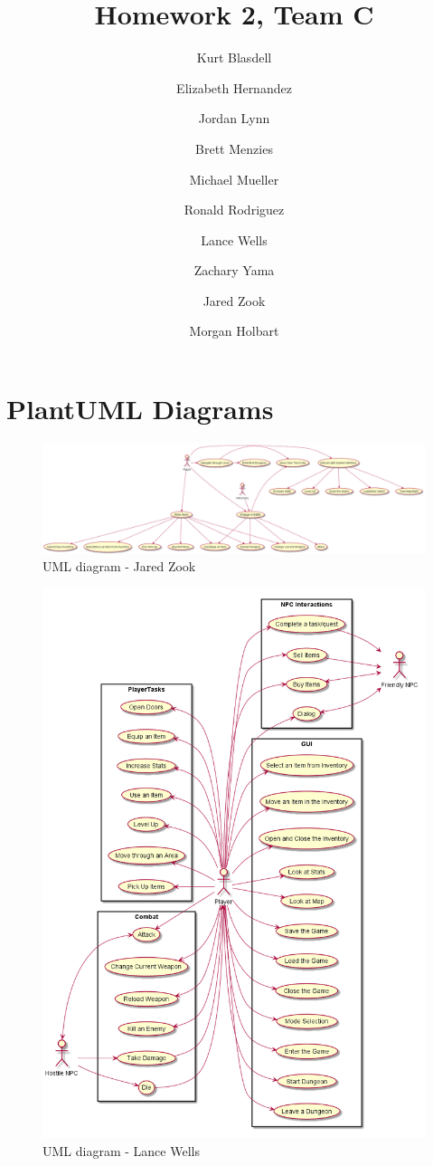 \documentclass[12pt]{report}
\title{Homework 2, Team C}
\author{ Kurt Blasdell 
\and Elizabeth Hernandez 
\and Jordan Lynn 
\and Brett Menzies 
\and Michael Mueller 
\and Ronald Rodriguez 
\and Lance Wells 
\and Zachary Yama 
\and Jared Zook 
\and Morgan Holbart
}
\begin{document}
    \maketitle

\tableofcontents{}

\chapter{PlantUML Diagrams}
\begin{figure}
	\includegraphics[scale=0.25,left]{uml-Jared_Zook.png}
	\caption{UML diagram - Jared Zook}
\end{figure}

\begin{figure}
	\centering
	\includegraphics[scale=0.4,center]{uml-Lance_Wells.png}
	\caption{UML diagram - Lance Wells}
\end{figure}
\end{document}
